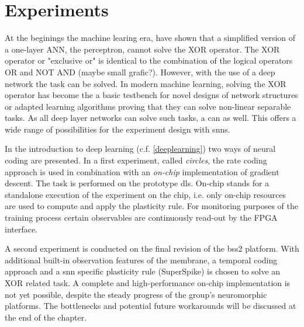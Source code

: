 \chapter{Experiments}
At the beginings the machine learing era, \cite{perceptron} have shown that a simplified version of a one-layer ANN, the perceptron, cannot solve the XOR operator. The XOR operator or "exclusive or" is identical to the combination of the logical operators OR and NOT AND (maybe small grafic?). However, with the use of a deep network the task can be solved. In modern machine learning, solving the XOR operator has become the a basic testbench for novel designs of network structures or adapted learning algorithms proving that they can solve non-linear separable tasks. As all deep layer networks can solve such tasks, a  can as well. This offers a wide range of possibilities for the experiment design with \glspl{snn}.

In the introduction to deep learning (c.f. \ref{deeplearning}) two ways of neural coding are presented. In a first experiment, called \textit{circles}, the rate coding approach is used in combination with an \textit{on-chip} implementation of gradient descent. The task is performed on the prototype \gls{dls}. On-chip stands for a standalone execution of the experiment on the chip, i.e. only on-chip resources are used to compute and apply the plasticity rule. For monitoring purposes of the training process certain observables are continuously read-out by the FPGA interface.

A second experiment is conducted on the final revision of the \gls{bss2} platform. With additional built-in observation features of the membrane, a temporal coding approach and a \gls{snn} specific plasticity rule (SuperSpike) is chosen to solve an XOR related task. A complete and high-performance on-chip implementation is not yet possible, despite the steady progress of the group's neuromorphic platforms. The bottlenecks and potential future workarounds will be discussed at the end of the chapter.\\


\newpage
